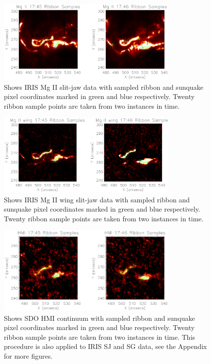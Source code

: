 \begin{figure}[H]
  \begin{center}
  \includegraphics[width=0.8\textwidth]{29-Mar-14-MG-Ribbon-Coord-oplot}
  \end{center}
  \caption{Shows IRIS Mg II slit-jaw data with sampled ribbon and sunquake pixel coordinates marked in green and blue respectively. Twenty ribbon sample points are taken from two instances in time.}\label{mgrib}
\end{figure}

\begin{figure}[H]
  \begin{center}
  \includegraphics[width=0.8\textwidth]{29-Mar-14-MGW-Ribbon-Coord-oplot}
  \end{center}
  \caption{Shows IRIS Mg II wing slit-jaw data with sampled ribbon and sunquake pixel coordinates marked in green and blue respectively. Twenty ribbon sample points are taken from two instances in time.}\label{mgwrib}
\end{figure}

\begin{figure}[H]
  \begin{center}
  \includegraphics[width=0.8\textwidth]{29-Mar-14-HMI-Ribbon-Coord-oplot}
  \end{center}
  \caption{Shows SDO HMI continuum with sampled ribbon and sunquake pixel coordinates marked in green and blue respectively. Twenty ribbon sample points are taken from two instances in time. This procedure is also applied to IRIS SJ and SG data, see the Appendix for more figures.}\label{hmirib}
\end{figure}


